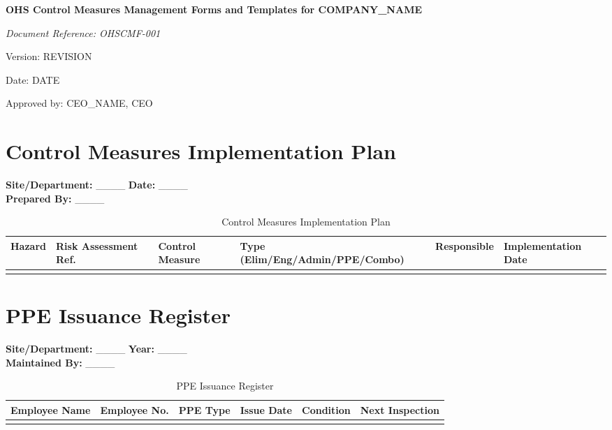 \documentclass[12pt]{article}
\begin{document}
\begin{titlepage}
    \centering
    \vspace*{2cm}
    {\LARGE\bfseries OHS Control Measures Management Forms and Templates for {{COMPANY_NAME}}\par}
    \vspace{1cm}
    {\large\itshape Document Reference: OHSCMF-001\par}
    \vspace{0.5cm}
    {\normalsize Version: {{REVISION}}\par}
    \vspace{0.5cm}
    {\normalsize Date: {{DATE}}\par}
    \vspace{2cm}
    {\normalsize Approved by: {{CEO_NAME}}, CEO\par}
\end{titlepage}

\section{Control Measures Implementation Plan}

\textbf{Site/Department:} \_\_\_\_ \textbf{Date:} \_\_\_\_\\
\textbf{Prepared By:} \_\_\_\_

\begin{table}[h]
    \centering
    \begin{tabular}{p{2cm}p{3cm}p{3cm}p{2cm}p{2cm}p{2cm}}
        \toprule
        \textbf{Hazard} & \textbf{Risk Assessment Ref.} & \textbf{Control Measure} & \textbf{Type (Elim/Eng/Admin/PPE/Combo)} & \textbf{Responsible} & \textbf{Implementation Date} \\
        \midrule
        & & & & & \\
        \bottomrule
    \end{tabular}
    \caption{Control Measures Implementation Plan}
\end{table}

\section{PPE Issuance Register}

\textbf{Site/Department:} \_\_\_\_ \textbf{Year:} \_\_\_\_\\
\textbf{Maintained By:} \_\_\_\_

\begin{table}[h]
    \centering
    \begin{tabular}{p{2cm}p{2cm}p{2cm}p{2cm}p{2cm}p{2cm}}
        \toprule
        \textbf{Employee Name} & \textbf{Employee No.} & \textbf{PPE Type} & \textbf{Issue Date} & \textbf{Condition} & \textbf{Next Inspection} \\
        \midrule
        & & & & & \\
        \bottomrule
    \end{tabular}
    \caption{PPE Issuance Register}
\end{table}
\end{document}
